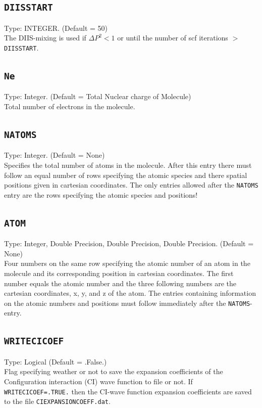 \documentclass[a4paper,twoside,openany]{book}
\begin{document}
{{{{ \subsection{\texttt{DIISSTART}}
Type: INTEGER. (Default = 50)\\
The DIIS-mixing is used if $\Delta P^{2} < 1$ or until the number of scf iterations $>$ \texttt{DIISSTART}.

\subsection{\texttt{Ne}}
Type: Integer. (Default = Total Nuclear charge of Molecule)\\
Total number of electrons in the molecule.

\subsection{\texttt{NATOMS}}
Type: Integer. (Default = None)\\
Specifies the total number of atoms in the molecule. After this entry there must follow an equal number of rows specifying the atomic species and there 
spatial positions given in cartesian coordinates. The only entries allowed after the \texttt{NATOMS} entry are the rows specifying the atomic species and positions!

\subsection{\texttt{ATOM}}
Type: Integer, Double Precision,  Double Precision,  Double Precision. (Default = None)\\
Four numbers on the same row specifying the atomic number of an atom in the molecule and its corresponding  position in cartesian coordinates. The first number equals the atomic 
number and the three following numbers are the cartesian coordinates, x, y, and z of the atom. 
The entries containing information on the atomic numbers and positions must follow immediately after the \texttt{NATOMS}-entry.

\subsection{\texttt{WRITECICOEF}}
Type: Logical (Default = .False.)\\
Flag specifying weather or not to save the expansion coefficients of the Configuration interaction (CI)  wave function to file or not. If \texttt{WRITECICOEF=.TRUE.} then the CI-wave function 
expansion coefficients are saved to the file \texttt{CIEXPANSIONCOEFF.dat}.

}}}}
\end{document}
